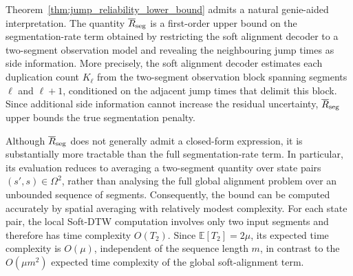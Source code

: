 \documentclass[onecolumn]{IEEEtran}
\theoremstyle{definition}
\begin{document}


Theorem~\ref{thm:jump_reliability_lower_bound} admits a natural genie-aided interpretation. The quantity $\overline{R}_{\rm seg}$ is a first-order upper bound on the segmentation-rate term obtained by restricting the soft alignment decoder to a two-segment observation model and revealing the neighbouring jump times as side information. More precisely, the soft alignment decoder estimates each duplication count $K_\ell$ from the two-segment observation block spanning segments $\ell$ and $\ell+1$, conditioned on the adjacent jump times that delimit this block. {Since additional side information cannot increase the residual uncertainty, $\overline{R}_{\rm seg}$ upper bounds the true segmentation penalty.}

Although $\overline{R}_{\rm seg}$ does not generally admit a closed-form
expression, it is substantially more tractable than the full segmentation-rate
term. In particular, its evaluation reduces to averaging a two-segment
quantity over state pairs $(s',s)\in\Omega^2$, rather than analysing the full
global alignment problem over an unbounded sequence of segments. Consequently,
the bound can be computed accurately by spatial averaging with relatively
modest complexity. {For each state pair, the local Soft-DTW computation involves
only two input segments and therefore has time complexity \(O(T_2)\).
Since \(\mathbb{E}[T_2]=2\mu\), its expected time complexity is
\(O(\mu)\), independent of the sequence length \(m\), in contrast to the
\(O(\mu m^2)\) expected time complexity of the global soft-alignment term.}
\end{document}
